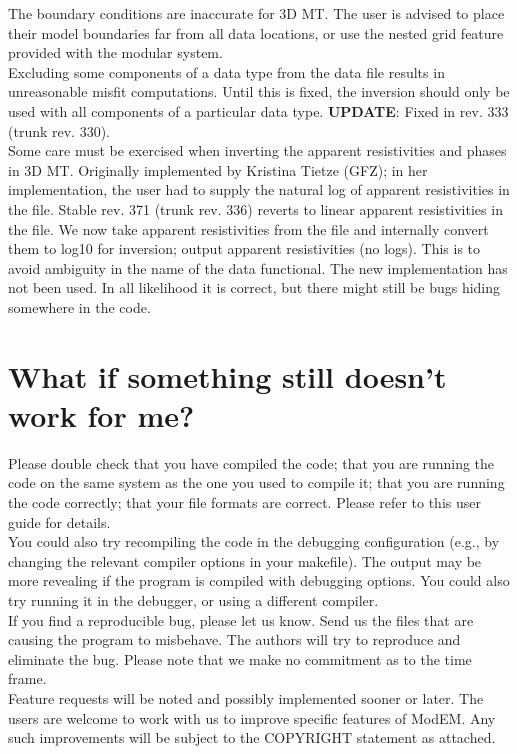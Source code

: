 \documentclass[12pt]{article}
\begin{document}
The boundary conditions are inaccurate for 3D MT. The user is advised to place their model boundaries far from all data locations, or use the nested grid feature provided with the modular system.\\

Excluding some components of a data type from the data file results in unreasonable misfit computations. Until this is fixed, the inversion should only be used with all components of a particular data type. \textbf{UPDATE}: Fixed in rev. 333 (trunk rev. 330).\\

Some care must be exercised when inverting the apparent resistivities and phases in 3D MT. Originally implemented by Kristina Tietze (GFZ); in her implementation, the user had to supply the natural log of apparent resistivities in the file. Stable rev. 371 (trunk rev. 336) reverts to linear apparent resistivities in the file. We now take apparent resistivities from the file and internally convert them to log10 for inversion; output apparent resistivities (no logs). This is to avoid ambiguity in the name of the data functional. The new implementation has not been used. In all likelihood it is correct, but there might still be bugs hiding somewhere in the code.\\


\section{What if something still doesn't work for me?}

Please double check that you have compiled the code; that you are running the code on the same system as the one you used to compile it; that you are running the code correctly; that your file formats are correct. Please refer to this user guide for details.\\

You could also try recompiling the code in the debugging configuration (e.g., by changing the relevant compiler options in your makefile). The output may be more revealing if the program is compiled with debugging options. You could also try running it in the debugger, or using a different compiler.\\

If you find a reproducible bug, please let us know. Send us the files that are causing the program to misbehave. The authors will try to reproduce and eliminate the bug. Please note that we make no commitment as to the time frame.\\

Feature requests will be noted and possibly implemented sooner or later.
The users are welcome to work with us to improve specific features of ModEM.
Any such improvements will be subject to the COPYRIGHT statement as attached.
\end{document}
